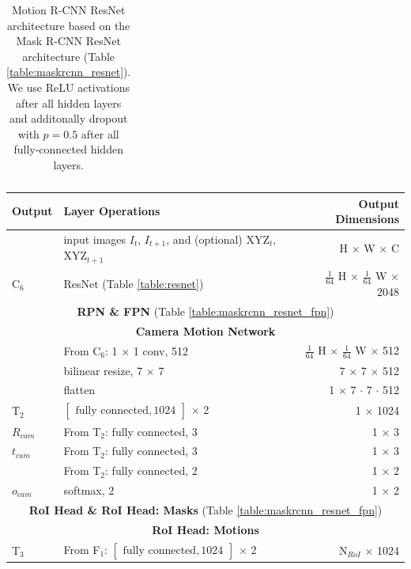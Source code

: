 {\begin{table}[h]
\begin{tabular}{llr}
\bottomrule
\end{tabular}

\caption {
Motion R-CNN ResNet architecture based on the Mask R-CNN
ResNet architecture (Table \ref{table:maskrcnn_resnet}).
We use ReLU activations after all hidden layers and
additonally dropout with $p = 0.5$ after all fully-connected hidden layers.
}
\label{table:motionrcnn_resnet}
\end{table}
}

{
\begin{table}[h]
\centering
\begin{tabular}{llr}
\toprule
\textbf{Output} & \textbf{Layer Operations} & \textbf{Output Dimensions} \\
\midrule\midrule
& input images $I_t$, $I_{t+1}$, and (optional) XYZ$_{t}$, XYZ$_{t+1}$  & H $\times$ W $\times$ C \\
\midrule
C$_6$ & ResNet (Table \ref{table:resnet}) & $\tfrac{1}{64}$ H $\times$ $\tfrac{1}{64}$ W $\times$ 2048 \\
\midrule
\multicolumn{3}{c}{\textbf{RPN \& FPN} (Table \ref{table:maskrcnn_resnet_fpn})} \\
\midrule
\multicolumn{3}{c}{\textbf{Camera Motion Network}}\\
\midrule
& From C$_6$: 1 $\times$ 1 conv, 512 & $\tfrac{1}{64}$ H $\times$ $\tfrac{1}{64}$ W $\times$ 512 \\
& bilinear resize, 7 $\times$ 7 & 7 $\times$ 7 $\times$ 512 \\
& flatten & 1 $\times$ 7 $\cdot$ 7 $\cdot$ 512 \\
T$_2$ & $\begin{bmatrix}\textrm{fully connected}, 1024\end{bmatrix}$ $\times$ 2  & 1 $\times$ 1024 \\
$R_{cam}$& From T$_2$: fully connected, 3 & 1 $\times$ 3 \\
$t_{cam}$& From T$_2$: fully connected, 3 & 1 $\times$ 3 \\
& From T$_2$: fully connected, 2 & 1 $\times$ 2 \\
$o_{cam}$& softmax, 2 & 1 $\times$ 2 \\
\midrule
\multicolumn{3}{c}{\textbf{RoI Head \& RoI Head: Masks} (Table \ref{table:maskrcnn_resnet_fpn})} \\
\midrule
\multicolumn{3}{c}{\textbf{RoI Head: Motions}}\\
\midrule
T$_3$ & From F$_1$: $\begin{bmatrix}\textrm{fully connected}, 1024\end{bmatrix}$ $\times$ 2 & N$_{RoI}$ $\times$ 1024 \\

\end{tabular}
\end{table}}
